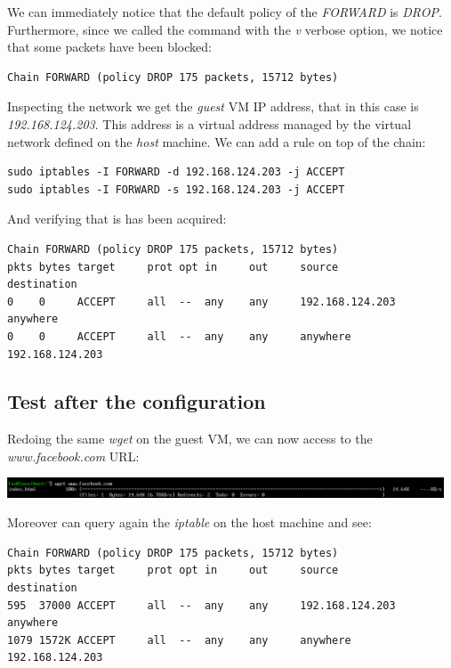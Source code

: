 \documentclass{article}
\begin{document}
We can immediately notice that the default policy of the \emph{FORWARD} is \emph{DROP}. 
Furthermore, since we called the command with the \emph{v} verbose option,
we notice that some packets have been blocked:

\begin{verbatim}
Chain FORWARD (policy DROP 175 packets, 15712 bytes)
\end{verbatim}

Inspecting the network we get the \emph{guest} VM
IP address, that in this case is \emph{192.168.124.203}.
This address is a virtual address managed by the virtual network
defined on the \emph{host} machine.
We can add a rule on top of the chain:

\begin{verbatim}
sudo iptables -I FORWARD -d 192.168.124.203 -j ACCEPT
sudo iptables -I FORWARD -s 192.168.124.203 -j ACCEPT
\end{verbatim}

And verifying that is has been acquired:

\begin{verbatim}
Chain FORWARD (policy DROP 175 packets, 15712 bytes)
pkts bytes target     prot opt in     out     source               destination         
0    0 	   ACCEPT     all  --  any    any     192.168.124.203      anywhere            
0    0     ACCEPT     all  --  any    any     anywhere             192.168.124.203 
\end{verbatim}

\subsection{Test after the configuration}

Redoing the same \emph{wget} on the guest VM, we can now
access to the \emph{www.facebook.com} URL:

\includegraphics[width=13cm]{h8-5}

\noindent Moreover can query again the \emph{iptable} on the host machine and see:

\begin{verbatim}
Chain FORWARD (policy DROP 175 packets, 15712 bytes)
pkts bytes target     prot opt in     out     source            destination         
595  37000 ACCEPT     all  --  any    any     192.168.124.203   anywhere            
1079 1572K ACCEPT     all  --  any    any     anywhere          192.168.124.203  
\end{verbatim}
\end{document}
